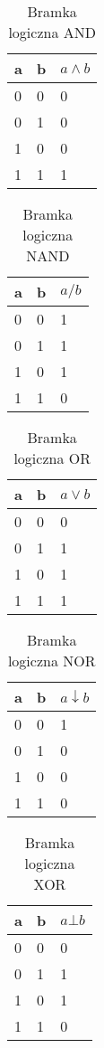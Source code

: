 \documentclass[12pt, letterpaper, titlepage]{article}
\begin{document}
\begin{table}[h]
\centering\caption{Bramka logiczna AND}
\begin{tabular}{l l|l}

a & b & $a\wedge b$\\
\hline
0 & 0 & 0\\
0 & 1 & 0\\
1 & 0 & 0\\
1 & 1 & 1\\

\end{tabular}
\end{table}

\begin{table}[h]
\centering\caption{Bramka logiczna NAND}
\begin{tabular}{l l|l}

a & b & $a/b$\\
\hline
0 & 0 & 1\\
0 & 1 & 1\\
1 & 0 & 1\\
1 & 1 & 0\\

\end{tabular}
\end{table}
\begin{table}[h]
\centering\caption{Bramka logiczna OR}
\begin{tabular}{l l|l}

a & b & $a\vee b$\\
\hline
0 & 0 & 0\\
0 & 1 & 1\\
1 & 0 & 1\\
1 & 1 & 1\\

\end{tabular}
\end{table}
\begin{table}[h]
\centering\caption{Bramka logiczna NOR}
\begin{tabular}{l l|l}

a & b & $a\downarrow b$\\
\hline
0 & 0 & 1\\
0 & 1 & 0\\
1 & 0 & 0\\
1 & 1 & 0\\

\end{tabular}
\end{table}
\begin{table}[h]
\centering\caption{Bramka logiczna XOR}
\begin{tabular}{l l|l}

a & b & $a\bot b$\\
\hline
0 & 0 & 0\\
0 & 1 & 1\\
1 & 0 & 1\\
1 & 1 & 0\\

\end{tabular}
\end{table}
\end{document}
